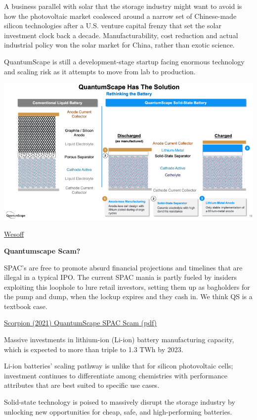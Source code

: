 \documentclass[
]{book}
\begin{document}
A business parallel with solar that the storage industry might want to avoid is how the photovoltaic market coalesced around a narrow set of Chinese-made silicon technologies after a U.S. venture capital frenzy that set the solar investment clock back a decade. Manufacturability, cost reduction and actual industrial policy won the solar market for China, rather than exotic science.

QuantumScape is still a development-stage startup facing enormous technology and scaling risk as it attempts to move from lab to production.

\includegraphics{fig/quantumscape.png}

\href{https://www.canarymedia.com/articles/quantumscapes-billion-dollar-battery-experiment/}{Wesoff}

\textbf{Quantumscape Scam?}

SPAC's are free to promote absurd financial projections and
timelines that are illegal in a typical IPO. The current SPAC
mania is partly fueled by insiders exploiting this loophole to
lure retail investors, setting them up as bagholders for the
pump and dump, when the lockup expires and they cash in.
We think QS is a textbook case.

\href{pdf/Scorpion_2021_Quantumscape.pdf}{Scorpion (2021) QuantumScape SPAC Scam (pdf)}

Massive investments in lithium-ion (Li-ion) battery manufacturing capacity,
which is expected to more than triple to 1.3 TWh by 2023.

Li-ion batteries' scaling pathway is unlike that for silicon
photovoltaic cells; investment continues to differentiate
among chemistries with performance attributes that are
best suited to specific use cases.

Solid-state technology is poised to massively disrupt
the storage industry by unlocking new opportunities for
cheap, safe, and high-performing batteries.
\end{document}
